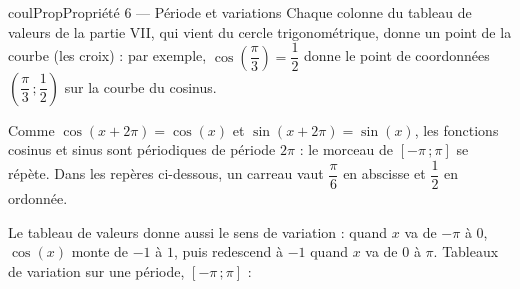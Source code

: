 \documentclass[11pt,a4paper]{article}
\makeatletter
\newcommand{\lycee@intff}[2]{\left[#1\,;#2\right]}
\providecommand{\intff}{\lycee@intff}%
\newcounter{lycee@signet}
\newcommand{\signet}[3][]{\stepcounter{lycee@signet}%
  \edef\lycee@dest{\if\relax\detokenize{#1}\relax
    signet.\arabic{lycee@signet}\else#1\fi}%
  \hypertarget{\lycee@dest}{}\bookmark[level=#2,dest=\lycee@dest]{#3}}
\newenvironment{proprietebox}[1][Propriété]%
  {\begin{boitecours}[phantom={\signet{2}{#1}}]{coulProp}{#1}}{\end{boitecours}}
\makeatother
\begin{document}
\begin{proprietebox}[Propriété 6 --- Période et variations]
Chaque colonne du tableau de valeurs de la partie VII, qui vient du cercle trigonométrique,
donne un point de la courbe (les croix) : par exemple, $\cos\left(\dfrac{\pi}{3}\right)=\dfrac{1}{2}$
donne le point de coordonnées $\left(\dfrac{\pi}{3}\,;\dfrac{1}{2}\right)$ sur la courbe du cosinus.

\smallskip
Comme $\cos(x+2\pi)=\cos(x)$ et $\sin(x+2\pi)=\sin(x)$, les fonctions cosinus et sinus sont
périodiques de période $2\pi$ : le morceau de $\intff{-\pi}{\pi}$ se répète. Dans les repères
ci-dessous, un carreau vaut $\dfrac{\pi}{6}$ en abscisse et $\dfrac{1}{2}$ en ordonnée.
\begin{center}

\medskip
{}
\end{center}
Le tableau de valeurs donne aussi le sens de variation : quand $x$ va de $-\pi$ à $0$,
$\cos(x)$ monte de $-1$ à $1$, puis redescend à $-1$ quand $x$ va de $0$ à $\pi$.
Tableaux de variation sur une période, $\intff{-\pi}{\pi}$ :

\medskip
\begin{minipage}[t]{0.48\linewidth}\centering
{}
\end{minipage}\hfill
\begin{minipage}[t]{0.48\linewidth}\centering
{}
\end{minipage}
\end{proprietebox}
\end{document}
